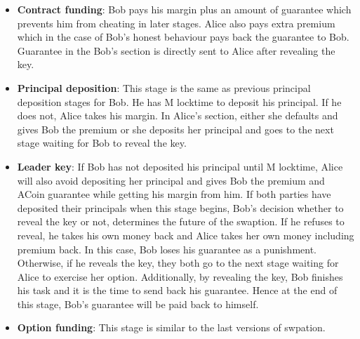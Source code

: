 \begin{itemize}
    \item \textbf{Contract funding}: Bob pays his margin plus an amount of guarantee which prevents him from cheating in later stages. Alice also pays extra premium which in the case of Bob's honest behaviour pays back the guarantee to Bob. Guarantee in the Bob's section is directly sent to Alice after revealing the \Aone key. 
    
    \item \textbf{Principal deposition}: This stage is the same as previous principal deposition stages for Bob. He has M locktime to deposit his principal. If he does not, Alice takes his margin. In Alice's section, either she defaults and gives Bob the premium or she deposits her principal and goes to the next stage waiting for Bob to reveal the \keyone key.
    
    \item \textbf{Leader key}: If Bob has not deposited his principal until M locktime, Alice will also avoid depositing her principal and gives Bob the premium and ACoin guarantee while getting his margin from him.
    If both parties have deposited their principals when this stage begins, Bob's decision whether to reveal the \keyone key or not, determines the future of the swaption. If he refuses to reveal, he takes his own money back and Alice takes her own money including premium back. In this case, Bob loses his guarantee as a punishment. Otherwise, if he reveals the \keyone key, they both go to the next stage waiting for Alice to exercise her option. Additionally, by revealing the \keyone key, Bob finishes his task and it is the time to send back his guarantee. Hence at the end of this stage, Bob's guarantee will be paid back to himself.
    
    \item \textbf{Option funding}: This stage is similar to the last versions of swpation.
\end{itemize}

